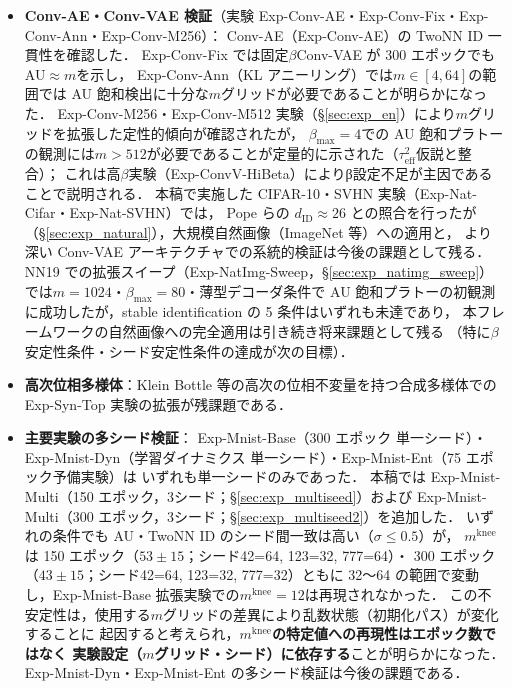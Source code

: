 \documentclass[11pt,a4paper]{jsarticle}
\newcommand{\mknee}{m^{\mathrm{knee}}}
\begin{document}
\begin{itemize}
  \item \textbf{Conv-AE・Conv-VAE 検証}（実験 Exp-Conv-AE・Exp-Conv-Fix・Exp-Conv-Ann・Exp-Conv-M256）：
        Conv-AE（Exp-Conv-AE）の TwoNN ID 一貫性を確認した．
        Exp-Conv-Fix では固定$\beta$Conv-VAE が 300 エポックでも AU$\approx m$を示し，
        Exp-Conv-Ann（KL アニーリング）では$m\in[4,64]$の範囲では AU 飽和検出に十分な$m$グリッドが必要であることが明らかになった．
        Exp-Conv-M256・Exp-Conv-M512 実験（§\ref{sec:exp_en}）により$m$グリッドを拡張した定性的傾向が確認されたが，
        $\beta_{\max}=4$での AU 飽和プラトーの観測には$m>512$が必要であることが定量的に示された（$\tau^2_\mathrm{eff}$仮説と整合）；
        これは高$\beta$実験（Exp-ConvV-HiBeta）によりβ設定不足が主因であることで説明される．
        本稿で実施した CIFAR-10・SVHN 実験（Exp-Nat-Cifar・Exp-Nat-SVHN）では，
        Pope ら\cite{pope2021intrinsic}の $d_\mathrm{ID} \approx 26$ との照合を行ったが
        （§\ref{sec:exp_natural}），大規模自然画像（ImageNet 等）への適用と，
        より深い Conv-VAE アーキテクチャでの系統的検証は今後の課題として残る．
        NN19 での拡張スイープ（Exp-NatImg-Sweep，§\ref{sec:exp_natimg_sweep}）では$m=1024$・$\beta_{\max}=80$・薄型デコーダ条件で
        AU 飽和プラトーの初観測に成功したが，stable identification の 5 条件はいずれも未達であり，
        本フレームワークの自然画像への完全適用は引き続き将来課題として残る
        （特に$\beta$安定性条件・シード安定性条件の達成が次の目標）．
  \item \textbf{高次位相多様体}：Klein Bottle 等の高次の位相不変量を持つ合成多様体での
        Exp-Syn-Top 実験の拡張が残課題である．
  \item \textbf{主要実験の多シード検証}：
        Exp-Mnist-Base（300 エポック 単一シード）・Exp-Mnist-Dyn（学習ダイナミクス 単一シード）・Exp-Mnist-Ent（75 エポック予備実験）は
        いずれも単一シードのみであった．
        本稿では Exp-Mnist-Multi（150 エポック，3シード；§\ref{sec:exp_multiseed}）および
        Exp-Mnist-Multi（300 エポック，3シード；§\ref{sec:exp_multiseed2}）を追加した．
        いずれの条件でも AU・TwoNN ID のシード間一致は高い（$\sigma \leq 0.5$）が，
        $\mknee$は 150 エポック（$53 \pm 15$；シード42=64, 123=32, 777=64）・
        300 エポック（$43 \pm 15$；シード42=64, 123=32, 777=32）ともに
        32〜64 の範囲で変動し，Exp-Mnist-Base 拡張実験での$\mknee = 12$は再現されなかった．
        この不安定性は，使用する$m$グリッドの差異により乱数状態（初期化パス）が変化することに
        起因すると考えられ，\textbf{$\mknee$の特定値への再現性はエポック数ではなく
        実験設定（$m$グリッド・シード）に依存する}ことが明らかになった．
        Exp-Mnist-Dyn・Exp-Mnist-Ent の多シード検証は今後の課題である．
\end{itemize}
\end{document}
